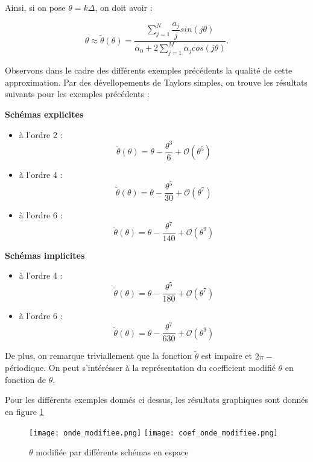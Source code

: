 \documentclass[10pt,a4paper]{amsart}
\begin{document}
Ainsi, si on pose $\theta = k \Delta$, on doit avoir :

\begin{equation}\label{nombre d'onde approché}
\theta \approx \tilde{\theta} \left( \theta \right) = \dfrac{\sum_{j=1}^{N} \dfrac{a_j}{j} sin\left( j \theta \right) }{  \alpha_0 + 2 \sum_{j=1}^{M} \alpha_j cos \left( j \theta \right) }.
\end{equation}

Observons dans le cadre des différents exemples précédents la qualité de cette approximation.
Par des dévellopements de Taylors simples, on trouve les résultats suivants pour les exemples précédents :



\textbf{Schémas explicites}
   
\begin{itemize}
\item à l'ordre 2 :
$$\tilde{\theta}(\theta) = \theta - \dfrac{\theta^3}{6} + \mathcal{O} \left( \theta^5 \right)$$

\item à l'ordre 4 :
$$\tilde{\theta}(\theta) = \theta - \dfrac{\theta^5}{30} + \mathcal{O} \left( \theta^7 \right)$$

\item à l'ordre 6 :
$$\tilde{\theta}(\theta) = \theta - \dfrac{\theta^7}{140} + \mathcal{O} \left( \theta^9 \right)$$

\end{itemize}
   
\textbf{Schémas implicites}
   
\begin{itemize}
\item à l'ordre 4 :
$$\tilde{\theta}(\theta) = \theta - \dfrac{\theta^5}{180} + \mathcal{O} \left( \theta^7 \right)$$

\item à l'ordre 6 :
$$\tilde{\theta}(\theta) = \theta - \dfrac{\theta^7}{630} + \mathcal{O} \left( \theta^9 \right)$$
\end{itemize}

De plus, on remarque triviallement que la fonction $\tilde{\theta}$ est impaire et $2 \pi-$périodique. On peut s'intérésser à la représentation du coefficient modifié $\theta$ en fonction de $\theta$.

Pour les différents exemples donnés ci dessus, les résultats graphiques sont donnés en figure \ref{LOM}


\begin{figure}[h!]
\texttt{[image: onde\_modifiee.png]}
\texttt{[image: coef\_onde\_modifiee.png]}
\caption{$\theta$ modifiée par différents schémas en espace}
\label{LOM}
\end{figure}
\end{document}
